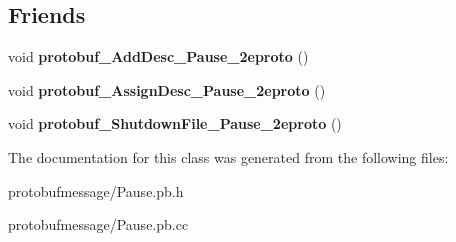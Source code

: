 \subsection*{Friends}
\begin{DoxyCompactItemize}
\item 
\hypertarget{class_pause_a6dd83dd31565ad93783f8d042924d6f3}{void {\bfseries protobuf\-\_\-\-Add\-Desc\-\_\-\-Pause\-\_\-2eproto} ()}\label{class_pause_a6dd83dd31565ad93783f8d042924d6f3}

\item 
\hypertarget{class_pause_a53e5c86813ef675cf1916aa78bc72131}{void {\bfseries protobuf\-\_\-\-Assign\-Desc\-\_\-\-Pause\-\_\-2eproto} ()}\label{class_pause_a53e5c86813ef675cf1916aa78bc72131}

\item 
\hypertarget{class_pause_a5e08f905ac1c337aaf3fc36ffff15713}{void {\bfseries protobuf\-\_\-\-Shutdown\-File\-\_\-\-Pause\-\_\-2eproto} ()}\label{class_pause_a5e08f905ac1c337aaf3fc36ffff15713}

\end{DoxyCompactItemize}


The documentation for this class was generated from the following files\-:\begin{DoxyCompactItemize}
\item 
protobufmessage/Pause.\-pb.\-h\item 
protobufmessage/Pause.\-pb.\-cc\end{DoxyCompactItemize}
